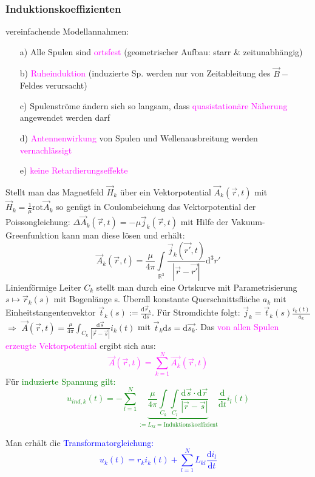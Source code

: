 \documentclass[]{article}
\newcommand{\R}{\ensuremath{\mathbb R}}
\newcommand{\dd}{\ensuremath{\text{d}}}
\begin{document}
\subsubsection{Induktionskoeffizienten}
	vereinfachende Modellannahmen: 
	\begin{enumerate}
		\item[a)] 
			Alle Spulen sind \textcolor{magenta}{ortsfest} (geometrischer Aufbau: starr \& zeitunabhängig) 
		\item[b)]
			\textcolor{magenta}{Ruheinduktion} (induzierte Sp. werden nur von Zeitableitung des $\vec{B}-$ Feldes verursacht)
		\item[c)]
			Spulenströme ändern sich so langsam, dass \textcolor{magenta}{quasistationäre Näherung }angewendet werden darf
		\item[d)]
			\textcolor{magenta}{Antennenwirkung} von Spulen und Wellenausbreitung werden \textcolor{magenta}{vernachlässigt}
		\item[e)] 
			\textcolor{magenta}{keine Retardierungseffekte}
	\end{enumerate}

	Stellt man das Magnetfeld $\vec{H}_k$ über ein Vektorpotential $\vec{A}_k(\vec{r},t)$ mit $\vec{H}_k=\frac{1}{\mu}\text{rot} \vec{A}_k $ so genügt in Coulombeichung das Vektorpotential der Poissongleichung: $\Delta\vec{A}_k(\vec{r},t)=-\mu\vec{j}_k(\vec{r},t)$ mit Hilfe der Vakuum-Greenfunktion kann man diese lösen und erhält:
	$$\vec{A}_k(\vec{r},t)=\frac{\mu}{4\pi}\int\limits_{\R^3}\frac{\vec{j}_k(\vec{r'},t)}{|\vec{r}-\vec{r'}|}\dd^3 r'$$
	Linienförmige Leiter $C_k$ stellt man durch eine Ortskurve mit Parametrisierung $s \mapsto \vec{r}_k(s)$ mit Bogenlänge s. Überall konstante Querschnittsfläche $a_k$ mit Einheitstangentenvektor $\vec{t}_k(s):=\frac{\dd \vec{r}_k}{\dd s}$. Für Stromdichte folgt: $\vec{j}_k=\vec{t}_k(s)\frac{i_k(t)}{a_k} $ $\Rightarrow$ $\vec{A}(\vec{r},t)=\frac{\mu}{4\pi}\int_{C_k}\frac{\dd \vec{s}}{|\vec{r}-\vec{s}|}i_k(t)$ mit $\vec{t}_k \dd s=\dd \vec{s_k}$. Das \textcolor{magenta}{von allen Spulen erzeugte Vektorpotential} ergibt sich aus: 
	\textcolor{magenta}{$$\vec{A}(\vec{r},t)=\sum\limits_{k=1}^{N}\vec{A_k}(\vec{r},t)$$}
	Für \textcolor{green}{induzierte Spannung gilt:
	$$u_{ind,k}(t)=-\sum\limits_{l=1}^N\underbrace{\frac{\mu}{4\pi}\int\limits_{C_k}\int\limits_{C_l}\frac{\dd \vec{s}\cdot \dd \vec{r}}{|\vec{r}-\vec{s}|}}_{:= L_{kl}=\text{Induktionskoeffizient}}\frac{\dd }{\dd t}i_l(t)$$}
	
	Man erhält die \textcolor{blue}{Transformatorgleichung: $$u_k(t)= r_ki_k(t)+\sum\limits_{l=1}^{N}L_{kl}\frac{\dd i_l}{\dd t}$$}
\end{document}
